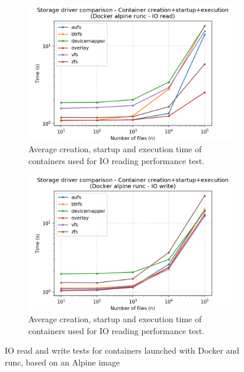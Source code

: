 \begin{figure}[!h]
    \begin{subfigure}{.5\textwidth}
      \centering
      \includegraphics[width=\linewidth]{images/storage-driver/storage-driver-full-Docker-alpine-runc---IO-read.png}
      \caption{Average creation, startup and execution time of containers used for IO reading performance test.}
      \label{fig:storage-driver:runc:io-read-full}
    \end{subfigure}
    \begin{subfigure}{.5\textwidth}
      \centering
      \includegraphics[width=\linewidth]{images/storage-driver/storage-driver-full-Docker-alpine-runc---IO-write.png}
      \caption{Average creation, startup and execution time of containers used for IO reading performance test.}
      \label{fig:storage-driver:runc:io-write-full}
    \end{subfigure}
    
    \caption{IO read and write tests for containers launched with Docker and runc, based on an Alpine image}
\end{figure}

